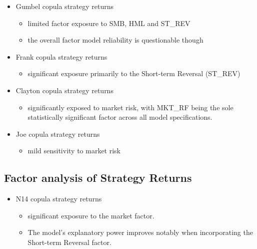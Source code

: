 \documentclass[
  letterpaper,
  DIV=11,
  numbers=noendperiod]{scrartcl}
\providecommand{\tightlist}{%
  \setlength{\itemsep}{0pt}\setlength{\parskip}{0pt}}\usepackage{longtable,booktabs,array}
\begin{document}
\begin{itemize}
\tightlist
\item
  Gumbel copula strategy returns

  \begin{itemize}
  \tightlist
  \item
    limited factor exposure to SMB, HML and ST\_REV
  \item
    the overall factor model reliability is questionable though
  \end{itemize}
\end{itemize}

\begin{itemize}
\tightlist
\item
  Frank copula strategy returns

  \begin{itemize}
  \tightlist
  \item
    significant exposure primarily to the Short-term Reversal (ST\_REV)
  \end{itemize}
\end{itemize}

\begin{itemize}
\tightlist
\item
  Clayton copula strategy returns

  \begin{itemize}
  \tightlist
  \item
    significantly exposed to market risk, with MKT\_RF being the sole
    statistically significant factor across all model specifications.
  \end{itemize}
\end{itemize}

\begin{itemize}
\tightlist
\item
  Joe copula strategy returns

  \begin{itemize}
  \tightlist
  \item
    mild sensitivity to market risk
  \end{itemize}
\end{itemize}

\subsection{Factor analysis of Strategy
Returns}\label{factor-analysis-of-strategy-returns-3}

\begin{itemize}
\tightlist
\item
  N14 copula strategy returns

  \begin{itemize}
  \tightlist
  \item
    significant exposure to the market factor.
  \item
    The model's explanatory power improves notably when incorporating
    the Short-term Reversal factor.
  \end{itemize}
\end{itemize}
\end{document}
